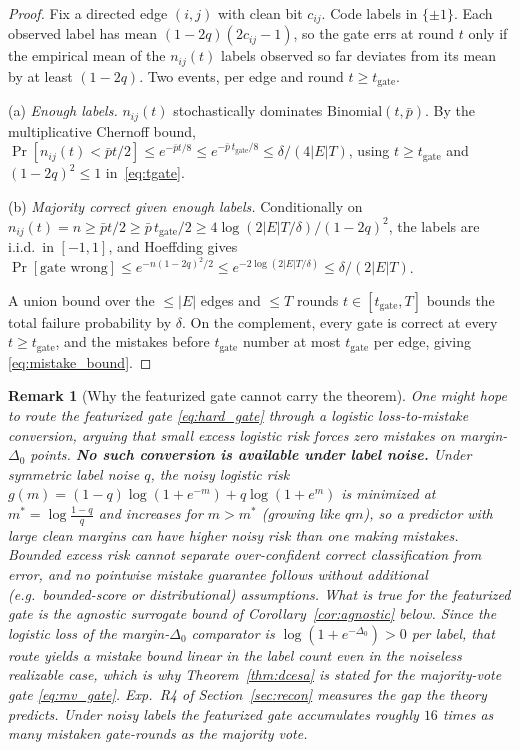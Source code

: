 \documentclass[11pt]{article}
\newtheorem{remark}[theorem]{Remark}
\begin{document}
\begin{proof}
Fix a directed edge $(i,j)$ with clean bit $c_{ij}$.  Code labels in
$\{\pm1\}$. Each observed label has mean $(1-2q)(2c_{ij}-1)$, so the
gate errs at round $t$ only if the empirical mean of the $n_{ij}(t)$
labels observed so far deviates from its mean by at least $(1-2q)$.
Two events, per edge and round $t\geq t_{\mathrm{gate}}$.

(a) \emph{Enough labels.}  $n_{ij}(t)$ stochastically dominates
$\mathrm{Binomial}(t,\bar p)$. By the multiplicative Chernoff bound,
$\Pr[n_{ij}(t)<\bar pt/2]\leq e^{-\bar pt/8}
\leq e^{-\bar p\,t_{\mathrm{gate}}/8}\leq\delta/(4|E|T)$,
using $t\geq t_{\mathrm{gate}}$ and $(1-2q)^2\leq 1$
in~\eqref{eq:tgate}.

(b) \emph{Majority correct given enough labels.}  Conditionally on
$n_{ij}(t)=n\geq\bar pt/2\geq\bar p\,t_{\mathrm{gate}}/2
\geq 4\log(2|E|T/\delta)/(1-2q)^2$, the labels are i.i.d.\ in
$[-1,1]$, and Hoeffding gives
$\Pr[\text{gate wrong}]\leq e^{-n(1-2q)^2/2}
\leq e^{-2\log(2|E|T/\delta)}\leq\delta/(2|E|T)$.

A union bound over the $\leq|E|$ edges and $\leq T$ rounds
$t\in[t_{\mathrm{gate}},T]$ bounds the total failure probability by
$\delta$.  On the complement, every gate is correct at every
$t\geq t_{\mathrm{gate}}$, and the mistakes before $t_{\mathrm{gate}}$
number at most $t_{\mathrm{gate}}$ per edge, giving
\eqref{eq:mistake_bound}.
\end{proof}

\begin{remark}[Why the featurized gate cannot carry the
theorem]\label{rem:gate_variants}
One might hope to route the featurized gate \eqref{eq:hard_gate}
through a logistic loss-to-mistake conversion, arguing that small
excess logistic risk forces zero mistakes on margin-$\Delta_0$ points.
\textbf{No such conversion is available under label noise.}  Under
symmetric label noise $q$, the noisy logistic risk
$g(m)=(1-q)\log(1+e^{-m})+q\log(1+e^{m})$ is minimized at
$m^*=\log\frac{1-q}{q}$ and \emph{increases} for $m>m^*$ (growing like
$qm$), so a predictor with large clean margins can have \emph{higher}
noisy risk than one making mistakes. Bounded excess risk cannot
separate over-confident correct classification from error, and no
pointwise mistake guarantee follows without additional (e.g.\
bounded-score or distributional) assumptions.  What \emph{is} true for
the featurized gate is the agnostic surrogate bound of
Corollary~\ref{cor:agnostic} below. Since the logistic loss of the
margin-$\Delta_0$ comparator is $\log(1+e^{-\Delta_0})>0$ per label,
that route yields a mistake bound \emph{linear} in the label count
even in the noiseless realizable case, which is why
Theorem~\ref{thm:dcesa} is stated for the majority-vote gate
\eqref{eq:mv_gate}.  Exp.~R4 of Section~\ref{sec:recon} measures the
gap the theory predicts. Under noisy labels the featurized gate
accumulates roughly $16$ times as many mistaken gate-rounds as the
majority vote.
\end{remark}
\end{document}
